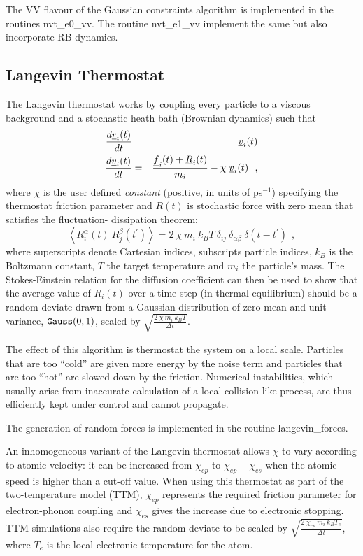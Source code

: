 The VV flavour of the Gaussian constraints algorithm is implemented
in the \D routines {\sc nvt\_e0\_vv}.
The routine {\sc nvt\_e1\_vv} implement the
same but also incorporate RB dynamics.

\subsection{Langevin Thermostat}

The Langevin thermostat works by coupling every particle to a
viscous background and a stochastic heath bath (Brownian dynamics) such that
\begin{eqnarray}
{d \mbox{$\underline{r}$}_{i}(t) \over d t} &=& \mbox{$\underline{v}$}_{i}(t) \nonumber \\
{d \mbox{$\underline{v}$}_{i}(t) \over d t} &=& {{\mbox{$\underline{f}$}_{i}(t)+\mbox{$\underline{R}$}_{i}(t)} \over
m_{i}} - \chi \; \mbox{$\underline{v}$}_{i}(t)~~,
\end{eqnarray}
where $\chi$ is the user defined {\em constant} (positive, in units of
ps$^{-1}$) specifying the thermostat friction parameter and $R(t)$ is
stochastic force with zero mean that satisfies the fluctuation-
dissipation theorem:
\begin{equation}
\left< R^{\alpha}_{i}(t)~R^{\beta}_{j}(t^\prime)\right> =
2~\chi~m_{i}~k_{B}T~\delta_{ij}~\delta_{\alpha \beta}~\delta(t-t^\prime)~~, \label{langevin}
\end{equation}
where superscripts denote Cartesian indices, subscripts particle
indices, $k_{B}$ is the Boltzmann constant, $T$ the target
temperature and $m_{i}$ the particle's mass.  The Stokes-Einstein
relation for the diffusion coefficient can then be used to show
that the average value of $R_{i}(t)$ over a time step (in thermal
equilibrium) should be a random deviate drawn from a Gaussian
distribution of zero mean and unit variance, ${\tt Gauss}(0,1)$,
scaled by $\sqrt{\frac{2~\chi~m_{i}~k_{B}T}{\Delta t}}$.

The effect of this algorithm is thermostat the system on a local
scale.  Particles that are too ``cold'' are given more energy by
the noise term and particles that are too ``hot'' are slowed down
by the friction.  Numerical instabilities, which usually arise from
inaccurate calculation of a local collision-like process, are thus
efficiently kept under control and cannot propagate.

The generation of random forces is implemented in the routine
{\sc langevin\_forces}.

An inhomogeneous variant of the Langevin thermostat \cite{duffy-07a}
allows $\chi$ to vary according to atomic velocity: it can be increased
from $\chi_{ep}$ to $\chi_{ep} + \chi_{es}$ when the atomic speed is
higher than a cut-off value. When using this thermostat as part of the
two-temperature model (TTM), $\chi_{ep}$ represents the required
friction parameter for electron-phonon coupling and $\chi_{es}$ gives
the increase due to electronic stopping. TTM simulations also
require the random deviate to be scaled by
$\sqrt{\frac{2~\chi_{ep}~m_{i}~k_{B}T_{e}}{\Delta t}}$, where
$T_{e}$ is the local electronic temperature for the atom.

